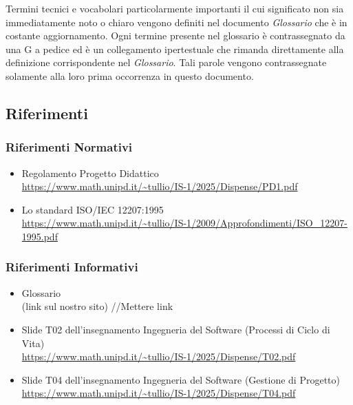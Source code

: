 \documentclass[12pt, a4paper]{article}
\begin{document}
Termini tecnici e vocabolari particolarmente importanti il cui
significato non sia immediatamente noto o chiaro vengono definiti nel
documento \emph{Glossario} che è in costante aggiornamento. Ogni termine
presente nel glossario è contrassegnato da una G a pedice ed è un
collegamento ipertestuale che rimanda direttamente alla definizione
corrispondente nel \emph{Glossario}. Tali parole vengono contrassegnate
solamente alla loro prima occorrenza in questo documento.

\subsection{Riferimenti}

\subsubsection{Riferimenti Normativi}

\begin{itemize}
\item
  Regolamento Progetto Didattico\\
  \href{https://www.math.unipd.it/~tullio/IS-1/2025/Dispense/PD1.pdf}{https://www.math.unipd.it/\textasciitilde tullio/IS-1/2025/Dispense/PD1.pdf}
\item
  Lo standard ISO/IEC 12207:1995\\
  \href{https://www.math.unipd.it/~tullio/IS-1/2009/Approfondimenti/ISO_12207-1995.pdf}{https://www.math.unipd.it/\textasciitilde tullio/IS-1/2009/Approfondimenti/ISO\_12207-1995.pdf}
\end{itemize}

\subsubsection{Riferimenti Informativi}

\begin{itemize}
\item
  Glossario\\
  (link sul nostro sito) //Mettere link
\item
  Slide T02 dell'insegnamento Ingegneria del Software (Processi di Ciclo
  di Vita)\\
  \href{https://www.math.unipd.it/~tullio/IS-1/2025/Dispense/T02.pdf}{https://www.math.unipd.it/\textasciitilde tullio/IS-1/2025/Dispense/T02.pdf}
\item
  Slide T04 dell'insegnamento Ingegneria del Software (Gestione di
  Progetto)\\
  \href{https://www.math.unipd.it/~tullio/IS-1/2025/Dispense/T04.pdf}{https://www.math.unipd.it/\textasciitilde tullio/IS-1/2025/Dispense/T04.pdf}
\end{itemize}
\end{document}
